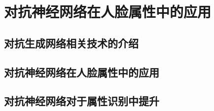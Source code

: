 \chapter{对抗神经网络在人脸属性中的应用}
\section{对抗生成网络相关技术的介绍}
\section{对抗神经网络在人脸属性中的应用}
\section{对抗神经网络对于属性识别中提升}




